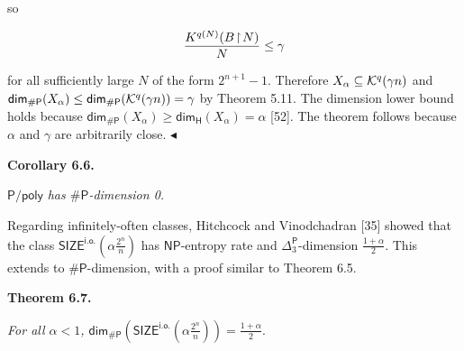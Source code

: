 \documentclass[10pt,a4paper]{article}
\begin{document}
so\par


\[\begin{gathered}
\frac{K^{q(N)}(B\negthinspace\upharpoonright\negthinspace N)}{N}\leq\gamma
\end{gathered}\]


for all sufficiently large $N$ of the form $2^{n+1}-1$. Therefore $X_{\alpha}\subseteq{\cal K}^{q}(\gamma n)$ and
${\mathsf{dim}}_{\mathsf{\#}\mathsf{P}}(X_{\alpha})\leq{\mathsf{dim}}_{\mathsf{\#}\mathsf{P}}({\cal K}^{q}(\gamma n))=\gamma$ by Theorem 5.11.
The dimension lower bound holds because ${\mathsf{dim}}_{\mathsf{\#}\mathsf{P}}(X_{\alpha})\allowbreak\geq{\mathsf{dim}}_{\mathsf{H}}(X_{\alpha})=\alpha$ [52]. The theorem follows because $\alpha$ and $\gamma$ are arbitrarily close.
$\blacktriangleleft$\par





\par\medskip\noindent\textbf{
\textbf{Corollary 6.6}\textbf{.}
}\par



${\mathsf{P}/\mathsf{poly}}$\emph{ has ${\mathsf{\#}\mathsf{P}}$-dimension 0.}\par






Regarding infinitely-often classes, Hitchcock and Vinodchadran [35] showed that the class
$\mathsf{SIZE}^{\mathsf{i.o.}}\!\!\left(\alpha\frac{2^{n}}{n}\right)$ has $\mathsf{NP}$-entropy rate and ${\Delta^{\mathsf{P}}_{3}}$-dimension $\frac{1+\alpha}{2}.$
This extends to ${\mathsf{\#}\mathsf{P}}$-dimension, with a proof similar to Theorem 6.5.\par





\par\medskip\noindent\textbf{
\textbf{Theorem 6.7}\textbf{.}
}\par



\emph{For all $\alpha<1$,
${\mathsf{dim}}_{{\mathsf{\#}\mathsf{P}}}\left(\mathsf{SIZE}^{\mathsf{i.o.}}\!\!\left(\alpha\frac{2^{n}}{n}\right)\right)=\frac{1+\alpha}{2}.$}\par
\end{document}
